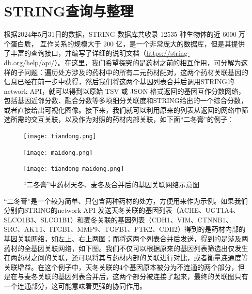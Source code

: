 \section{STRING查询与整理}

根据2024年5月31日的数据，STRING 数据库共收录 12535 种生物体的近 6000 万个蛋白质， 互作关系的规模大于 200 亿，是一个非常庞大的数据库，但是其提供了丰富的查询接口，并编写了详细的说明文档（\url{https://string-db.org/help/api/}）。在这里，我们希望探究的是药材之前的相互作用，可分解为这样的子问题：遍历处方涉及的药材中的所有二元药材配对，这两个药材关联基因的信息已经在前一步中获得，然后我们将这两个基因列表合并后调用STRING的 {network} API，就可以得到以原始 TSV 或 JSON 格式返回的基因互作分数网络，包括基因近邻分数、融合分数等多项细分关联度和STRING给出的一个综合分数，或者直接给出可视化图像。接下来，我们就可以利用原来的列表从返回的网络中筛选所需的交互关联，以及作为对照的药材内部关联，如下面“二冬膏”的例子：


\begin{figure}[htbp]
  \centering
  \begin{minipage}[b]{0.4\textwidth}
      \centering
      \texttt{[image: tiandong.png]}
  \end{minipage}
  \hspace{0.05\textwidth}
  \begin{minipage}[b]{0.4\textwidth}
      \centering
      \texttt{[image: maidong.png]}
  \end{minipage}

  \begin{minipage}[b]{0.95\textwidth}
      \centering
      \texttt{[image: tiandong-maidong.png]}
  \end{minipage}
  \caption{“二冬膏”中药材天冬、麦冬及合并后的基因关联网络示意图}
\end{figure}

“二冬膏”是一个较为简单、只包含两种药材的处方，方便用来作为示例。如果我们分别向STRING的{network} API 发送天冬关联的基因列表（ACHE、UGT1A4、SLCO1B3、SLCO1B1）和麦冬关联的基因列表（CDH1、VIM、CTNNB1、SRC、AKT1、ITGB1、MMP9、TGFB1、PTK2、CDH2）得到的是药材内部的基因关联网络，如左上、右上两图；而将这两个列表合并后发送，得到的是涉及两药材的全基因关联网络，如下图。我们不仅可以根据原来的基因列表筛选出仅发生在两药材之间的关联，还可以将其与药材内部的关联进行对比，或者衡量连通度等关联增益。在这个例子中，天冬关联的4个基因原本被分为不连通的两个部分，但是在与麦冬关联的基因列表合并后，这两个部分被连接了起来，最终的关联图只有一个连通部分，这可能意味着更强的协同作用。

\newpage

